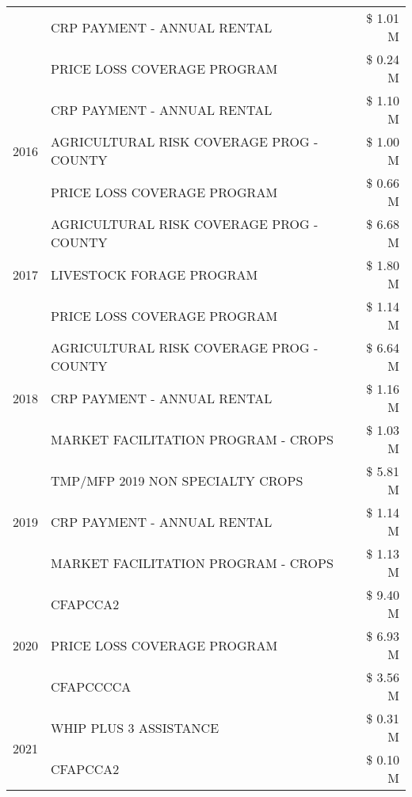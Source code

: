 \begin{tabular}{llr}
 & CRP PAYMENT - ANNUAL RENTAL & \$ 1.01 M \\
 & PRICE LOSS COVERAGE PROGRAM & \$ 0.24 M \\
\cline{1-3}
\multirow[t]{3}{*}{2016} & CRP PAYMENT - ANNUAL RENTAL & \$ 1.10 M \\
 & AGRICULTURAL RISK COVERAGE PROG - COUNTY & \$ 1.00 M \\
 & PRICE LOSS COVERAGE PROGRAM & \$ 0.66 M \\
\cline{1-3}
\multirow[t]{3}{*}{2017} & AGRICULTURAL RISK COVERAGE PROG - COUNTY & \$ 6.68 M \\
 & LIVESTOCK FORAGE PROGRAM & \$ 1.80 M \\
 & PRICE LOSS COVERAGE PROGRAM & \$ 1.14 M \\
\cline{1-3}
\multirow[t]{3}{*}{2018} & AGRICULTURAL RISK COVERAGE PROG - COUNTY & \$ 6.64 M \\
 & CRP PAYMENT - ANNUAL RENTAL & \$ 1.16 M \\
 & MARKET FACILITATION PROGRAM - CROPS & \$ 1.03 M \\
\cline{1-3}
\multirow[t]{3}{*}{2019} & TMP/MFP 2019 NON SPECIALTY CROPS & \$ 5.81 M \\
 & CRP PAYMENT - ANNUAL RENTAL & \$ 1.14 M \\
 & MARKET FACILITATION PROGRAM - CROPS & \$ 1.13 M \\
\cline{1-3}
\multirow[t]{3}{*}{2020} & CFAPCCA2 & \$ 9.40 M \\
 & PRICE LOSS COVERAGE PROGRAM & \$ 6.93 M \\
 & CFAPCCCCA & \$ 3.56 M \\
\cline{1-3}
\multirow[t]{2}{*}{2021} & WHIP PLUS 3 ASSISTANCE & \$ 0.31 M \\
 & CFAPCCA2 & \$ 0.10 M \\
\cline{1-3}
\bottomrule
\end{tabular}
